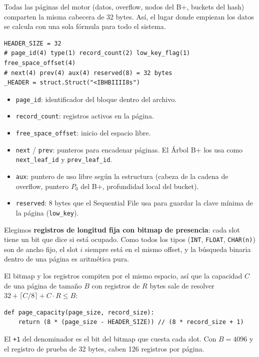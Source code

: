 \documentclass[11pt,a4paper]{article}
\newcommand{\code}[1]{\texttt{#1}}
\begin{document}
Todas las páginas del motor (datos, overflow, nodos del B+, buckets del hash)
comparten la misma cabecera de 32 bytes. Así, el lugar donde empiezan los datos se
calcula con una sola fórmula para todo el sistema.

\begin{lstlisting}
HEADER_SIZE = 32
# page_id(4) type(1) record_count(2) low_key_flag(1) free_space_offset(4)
# next(4) prev(4) aux(4) reserved(8) = 32 bytes
_HEADER = struct.Struct("<IBHBIIII8s")
\end{lstlisting}

\begin{itemize}
  \item \code{page\_id}: identificador del bloque dentro del archivo.
  \item \code{record\_count}: registros activos en la página.
  \item \code{free\_space\_offset}: inicio del espacio libre.
  \item \code{next} / \code{prev}: punteros para encadenar páginas. El Árbol B+ los
        usa como \code{next\_leaf\_id} y \code{prev\_leaf\_id}.
  \item \code{aux}: puntero de uso libre según la estructura (cabeza de la cadena de
        overflow, puntero $P_0$ del B+, profundidad local del bucket).
  \item \code{reserved}: 8 bytes que el Sequential File usa para guardar la clave
        mínima de la página (\code{low\_key}).
\end{itemize}

Elegimos \textbf{registros de longitud fija con bitmap de presencia}: cada slot tiene
un bit que dice si está ocupado. Como todos los tipos (\code{INT}, \code{FLOAT},
\code{CHAR(n)}) son de ancho fijo, el slot $i$ siempre está en el mismo offset, y la
búsqueda binaria dentro de una página es aritmética pura.

El bitmap y los registros compiten por el mismo espacio, así que la capacidad $C$ de
una página de tamaño $B$ con registros de $R$ bytes sale de resolver
$32 + \lceil C/8 \rceil + C \cdot R \le B$:

\begin{lstlisting}
def page_capacity(page_size, record_size):
    return (8 * (page_size - HEADER_SIZE)) // (8 * record_size + 1)
\end{lstlisting}

El \code{+1} del denominador es el bit del bitmap que cuesta cada slot. Con
$B = 4096$ y el registro de prueba de 32 bytes, caben 126 registros por página.
\end{document}
